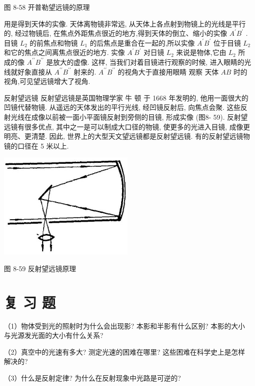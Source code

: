 \documentclass[10pt]{article}
\begin{document}
图 8-58 开普勒望远镜的原理

用是得到天体的实像. 天体离物镜非常远, 从天体上各点射到物镜上的光线是平行的, 经过物镜后, 在焦点外距焦点很近的地方,得到天体的倒立、缩小的实像 \({A}^{\prime }{B}^{\prime }\) . 目镜 \({L}_{2}\) 的前焦点和物镜 \({L}_{1}\) 的后焦点是重合在一起的,所以实像 \({A}^{\prime }{B}^{\prime }\) 位于目镜 \({L}_{2}\) 和它的焦点之间离焦点很近的地方. 实像 \({A}^{\prime }{B}^{\prime }\) 对日镜 \({L}_{2}\) 来说是物体,它由 \({L}_{2}\) 所成的像 \({A}^{\prime \prime }{B}^{\prime \prime }\) 是放大的虚像. 这样, 当我们对着目镜进行观察的时候, 进入眼睛的光线就好象直接从 \({A}^{\prime \prime }{B}^{\prime \prime }\) 射来的. \({A}^{\prime \prime }{B}^{\prime \prime }\) 的视角大于直接用眼睛 观察 天体 \({AB}\) 时的视角,可见望远镜增大了视角.

反射望远镜 反射望远镜是英国物理学家 牛 顿 于 1668 年发明的, 他用一面很大的凹镜代替物镜. 从遥远的天体发出的平行光线, 经凹镜反射后, 向焦点会聚. 这些反射光线在成像以前被一面小平面镜反射到旁侧的目镜, 形成实像 (图8- 59). 反射望远镜有很多优点, 其中之一是可以制成大口径的物镜, 使更多的光进入目镜, 成像更明亮、更清楚. 因此, 世界上的大型天文望远镜都是反射望远镜. 有的反射望远镜物镜的口径在 5 米以上.

\begin{center}
\includegraphics[max width=0.5\textwidth]{images/01913056-1f15-74d8-9184-9aab52c9d66b_292_118836.jpg}
\end{center}

图 8-59 反射望远镜原理

\section*{复 习 题}

（1）物体受到光的照射时为什么会出现影? 本影和半影有什么区别? 本影的大小与光源发光面的大小有什么关系?

（2）真空中的光速有多大? 测定光速的困难在哪里? 这些困难在科学史上是怎样解决的?

（3）什么是反射定律? 为什么在反射现象中光路是可逆的?
\end{document}
